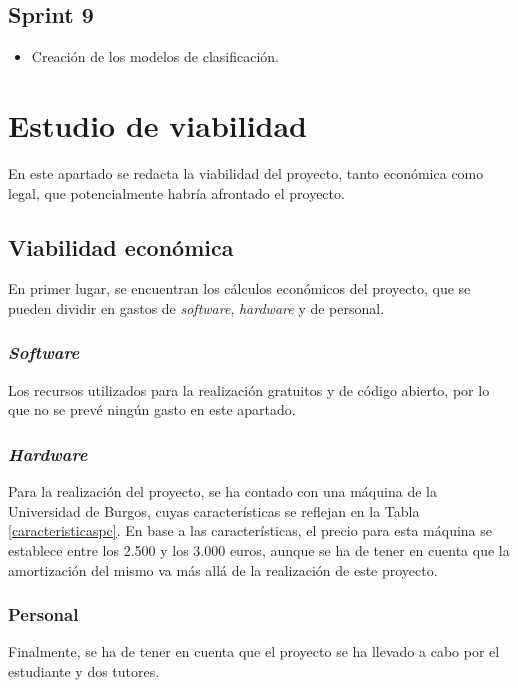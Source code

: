 \subsection{Sprint 9}

\begin{itemize}
\item Creación de los modelos de clasificación.
\end{itemize}

\section{Estudio de viabilidad}

En este apartado se redacta la viabilidad del proyecto, tanto económica como legal, que potencialmente habría afrontado el proyecto.

\subsection{Viabilidad económica}

En primer lugar, se encuentran los cálculos económicos del proyecto, que se pueden dividir en gastos de \textit{software}, \textit{hardware} y de personal.

\subsubsection{\textit{Software}}

Los recursos utilizados para la realización gratuitos y de código abierto, por lo que no se prevé ningún gasto en este apartado.

\subsubsection{\textit{Hardware}}

Para la realización del proyecto, se ha contado con una máquina de la Universidad de Burgos, cuyas características se reflejan en la Tabla \ref{caracteristicaspc}.
En base a las características, el precio para esta máquina se establece entre los 2.500 y los 3.000 euros, aunque se ha de tener en cuenta que la amortización del mismo va más allá de la realización de este proyecto.

\subsubsection{Personal}

Finalmente, se ha de tener en cuenta que el proyecto se ha llevado a cabo por el estudiante y dos tutores.

